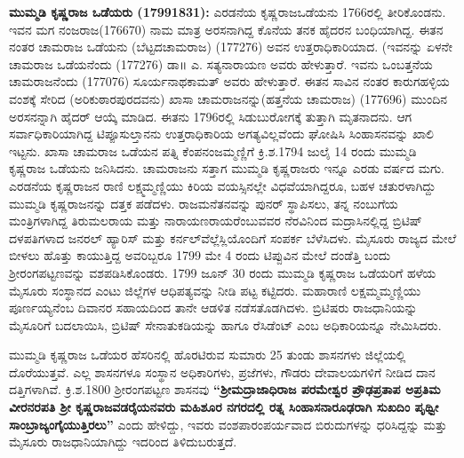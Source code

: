 \textbf{ಮುಮ್ಮಡಿ ಕೃಷ್ಣರಾಜ ಒಡೆಯರು (1799\general{\enginline{-}}1831): } ಎರಡನೆಯ ಕೃಷ್ಣರಾಜಒಡೆಯನು 1766ರಲ್ಲಿ ತೀರಿಕೊಂಡನು. ಇವನ ಮಗ ನಂಜರಾಜ(1766\enginline{-}70) ನಾಮ ಮಾತ್ರ ಅರಸನಾಗಿದ್ದ ಕೊನೆಯ ತನಕ ಹೈದರನ ಬಂಧಿಯಾಗಿದ್ದ. ಈತನ ನಂತರ ಚಾಮರಾಜ ಒಡೆಯನು (ಬೆಟ್ಟದಚಾಮರಾಜ) (1772\enginline{-}76) ಅವನ ಉತ್ತರಾಧಿಕಾರಿಯಾದ. (ಇವನನ್ನು ಏಳನೇ ಚಾಮರಾಜ ಒಡೆಯನೆಂದು (1772\enginline{-}76) ಡಾ॥ ಎ. ಸತ್ಯನಾರಾಯಣ ಅವರು ಹೇಳುತ್ತಾರೆ. ಇವನು ಒಂಬತ್ತನೆಯ ಚಾಮರಾಜನೆಂದು (1770\enginline{-}76) ಸೂರ್ಯನಾಥಕಾಮತ್​ ಅವರು ಹೇಳುತ್ತಾರೆ. ಈತನ ಸಾವಿನ ನಂತರ ಕಾರುಗಹಳ್ಳಿಯ ವಂಶಕ್ಕೆ ಸೇರಿದ (ಅರಿಕುಠಾರಪುರದವನು) ಖಾಸಾ ಚಾಮರಾಜನನ್ನು(ಹತ್ತನೆಯ ಚಾಮರಾಜ) (1776\enginline{-}96) ಮುಂದಿನ ಅರಸನನ್ನಾಗಿ ಹೈದರ್​ ಆಯ್ಕೆ ಮಾಡಿದ. ಈತನು 1796ರಲ್ಲಿ ಸಿಡುಬುರೋಗಕ್ಕೆ ತುತ್ತಾಗಿ ಮೃತನಾದನು. ಆಗ ಸರ್ವಾಧಿಕಾರಿಯಾಗಿದ್ದ ಟಿಪ್ಪೂಸುಲ್ತಾನನು ಉತ್ತರಾಧಿಕಾರಿಯ ಅಗತ್ಯವಿಲ್ಲವೆಂದು ಘೋಷಿಸಿ ಸಿಂಹಾಸನವನ್ನು ಖಾಲಿ ಇಟ್ಟನು. ಖಾಸಾ ಚಾಮರಾಜ ಒಡೆಯನ ಪತ್ನಿ ಕೆಂಪನಂಜಮ್ಮಣ್ಣಿಗೆ ಕ್ರಿ.ಶ.1794 ಜುಲೈ 14 ರಂದು ಮುಮ್ಮಡಿ ಕೃಷ್ಣರಾಜ ಒಡೆಯನು ಜನಿಸಿದನು. ಚಾಮರಾಜನು ಸತ್ತಾಗ ಮುಮ್ಮಡಿ ಕೃಷ್ಣರಾಜರು ಇನ್ನೂ ಎರಡು ವರ್ಷದ ಮಗು. ಎರಡನೆಯ ಕೃಷ್ಣರಾಜನ ರಾಣಿ ಲಕ್ಷ್ಮಮ್ಮಣ್ಣಿಯು ಕಿರಿಯ ವಯಸ್ಸಿ\-ನಲ್ಲೇ ವಿಧವೆಯಾಗಿದ್ದರೂ, ಬಹಳ ಚತುರಳಾಗಿದ್ದು ಮುಮ್ಮಡಿ ಕೃಷ್ಣರಾಜನನ್ನು ದತ್ತಕ ಪಡೆದಳು. ರಾಜಮನೆತನವನ್ನು ಪುನರ್​ ಸ್ಥಾಪಿಸಲು, ತನ್ನ ನಂಬುಗೆಯ ಮಂತ್ರಿಗಳಾಗಿದ್ದ ತಿರುಮಲರಾಯ ಮತ್ತು ನಾರಾಯಣರಾಯರೆಂಬುವವರ ನೆರವಿನಿಂದ ಮದ್ರಾಸಿನಲ್ಲಿದ್ದ ಬ್ರಿಟಿಷ್​ ದಳಪತಿಗಳಾದ ಜನರಲ್​ ಹ್ಯಾರಿಸ್​ ಮತ್ತು ಕರ್ನಲ್​ ವೆಲ್ಲೆಸ್ಲಿಯೊಂದಿಗೆ ಸಂಪರ್ಕ ಬೆಳೆಸಿದಳು. ಮೈಸೂರು ರಾಜ್ಯದ ಮೇಲೆ ಬೀಳಲು ಹೊತ್ತು ಕಾಯುತ್ತಿದ್ದ ಅವರಿಬ್ಬರೂ 1799 ಮೇ 4 ರಂದು ಟಿಪ್ಪುವಿನ ಮೇಲೆ ದಂಡೆತ್ತಿ ಬಂದು ಶ‍್ರೀರಂಗಪಟ್ಟಣವನ್ನು ವಶಪಡಿಸಿಕೊಂಡರು. 1799 ಜೂನ್​ 30 ರಂದು ಮುಮ್ಮಡಿ ಕೃಷ್ಣರಾಜ ಒಡೆಯರಿಗೆ ಹಳೆಯ ಮೈಸೂರು ಸಂಸ್ಥಾನದ ಎಂಟು ಜಿಲ್ಲೆಗಳ ಆಧಿಪತ್ಯವನ್ನು ನೀಡಿ ಪಟ್ಟ ಕಟ್ಟಿದರು. ಮಹಾರಾಣಿ ಲಕ್ಷಮ್ಮಮ್ಮಣ್ಣಿಯು ಪೂರ್ಣಯ್ಯನೆಂಬ ದಿವಾನರ ಸಹಾಯದಿಂದ ತಾನೇ ಆಡಳಿತ ನಡೆಸತೊಡಗಿದಳು. ಬ್ರಿಟಿಷರು ರಾಜಧಾನಿಯನ್ನು ಮೈಸೂರಿಗೆ ಬದಲಾಯಿಸಿ, ಬ್ರಿಟಿಷ್​ ಸೇನಾತುಕಡಿಯನ್ನು ಹಾಗೂ ರೆಸಿಡೆಂಟ್​ ಎಂಬ ಅಧಿಕಾರಿಯನ್ನೂ ನೇಮಿಸಿದರು.

ಮುಮ್ಮಡಿ ಕೃಷ್ಣರಾಜ ಒಡೆಯರ ಹೆಸರಿನಲ್ಲಿ ಹೊರಟಿರುವ ಸುಮಾರು 25 ತುಂಡು ಶಾಸನಗಳು ಜಿಲ್ಲೆಯಲ್ಲಿ ದೊರೆಯುತ್ತವೆ. ಎಲ್ಲ ಶಾಸನಗಳೂ ಸಂಸ್ಥಾನ ಅಧಿಕಾರಿಗಳು, ಪ್ರಜೆಗಳು, ಗೌಡರು ದೇವಾಲಯಗಳಿಗೆ ನೀಡಿದ ದಾನ ದತ್ತಿಗಳಾಗಿವೆ. ಕ್ರಿ.ಶ.1800 ಶ‍್ರೀರಂಗಪಟ್ಟಣ ಶಾಸನವು\textbf{ “ಶ‍್ರೀಮದ್ರಾಜಾಧಿರಾಜ ಪರಮೇಶ್ವರ ಪ್ರೌಢಪ್ರತಾಪ ಅಪ್ರತಿಮ ವೀರನರಪತಿ ಶ‍್ರೀ ಕೃಷ್ಣರಾಜವಡರೈಯ\-ನವರು ಮಹಿಶೂರ ನಗರದಲ್ಲಿ ರತ್ನ ಸಿಂಹಾಸನಾರೂಢರಾಗಿ ಸುಖದಿಂ ಪೃಥ್ವೀ ಸಾಂಬ್ರಾಜ್ಯಂಗೈಯುತ್ತಿರಲು” }ಎಂದು ಹೇಳಿದ್ದು, ಇವರು ವಂಶಪಾರಂಪರ್ಯವಾದ ಬಿರುದುಗಳನ್ನು ಧರಿಸಿದ್ದನ್ನು ಮತ್ತು ಮೈಸೂರು ರಾಜಧಾನಿಯಾಗಿದ್ದು ಇದರಿಂದ ತಿಳಿದು\-ಬರುತ್ತದೆ.

